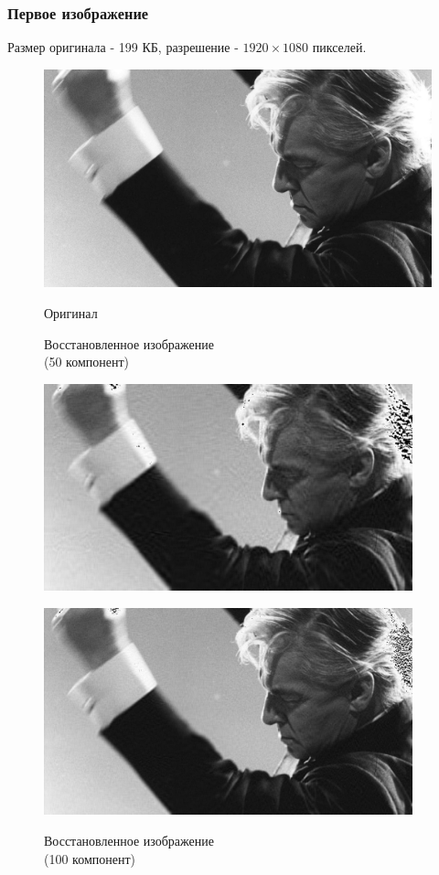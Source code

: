 \documentclass[a4paper]{article}
\begin{document}
\subsubsection{Первое изображение}
Размер оригинала - 199 КБ, разрешение - $1920\times 1080$ пикселей.
\begin{figure}[H]
    \centering
    \caption{Оригинал}
    \includegraphics[width = .5\textwidth]{resources/Herbert_von_Karajan.jpg}
    \label{fig:hvk}
\end{figure}
\begin{figure}[H]
\centering
    \begin{minipage}{.5\textwidth}
    \centering
    \caption{Восстановленное изображение \\(50 компонент)}
    \includegraphics[width = 0.95\textwidth]{reconstructions/with_50comps_Herbert_von_Karajan.jpg}
    \label{fig:hvk_50}
    \end{minipage}%
    \begin{minipage}{.5\textwidth}
    \caption{Восстановленное изображение \\(100 компонент)}
    \includegraphics[width = 0.95\textwidth]{reconstructions/with_100comps_Herbert_von_Karajan.jpg}
    \label{fig:hvk_100}
    \end{minipage}%
\end{figure}
\end{document}
